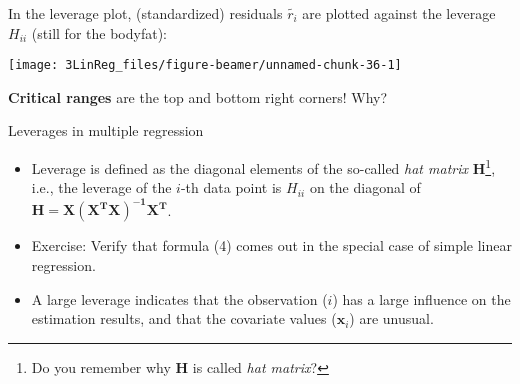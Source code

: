 \documentclass[10pt,ignorenonframetext,]{beamer}
\providecommand{\tightlist}{%
  \setlength{\itemsep}{0pt}\setlength{\parskip}{0pt}}
\begin{document}
\begin{frame}

In the leverage plot, (standardized) residuals \(\tilde{r_i}\) are
plotted against the leverage \(H_{ii}\) (still for the bodyfat):

\begin{center}\texttt{[image: 3LinReg\_files/figure-beamer/unnamed-chunk-36-1]} \end{center}

\textbf{Critical ranges} are the top and bottom right corners! Why?

\end{frame}

\begin{frame}

\begin{block}{Leverages in multiple regression}

\vspace{3mm}

\begin{itemize}
\tightlist
\item
  Leverage is defined as the diagonal elements of the so-called
  \emph{hat matrix}
  \(\mathbf{H}\)\footnote{Do you remember why $\mathbf{H}$ is called \emph{hat matrix}?},
  i.e., the leverage of the \(i\)-th data point is \(H_{ii}\) on the
  diagonal of \(\mathbf{H = X(X^TX)^{-1}X^T}\).
\end{itemize}

\vspace{40mm}

\begin{itemize}
\tightlist
\item
  Exercise: Verify that formula (4) comes out in the special case of
  simple linear regression.
\end{itemize}

\vspace{1mm}

\begin{itemize}
\tightlist
\item
  A large leverage indicates that the observation (\(i\)) has a large
  influence on the estimation results, and that the covariate values
  (\({\boldsymbol x}_i\)) are unusual.
\end{itemize}

\end{block}

\end{frame}
\end{document}
